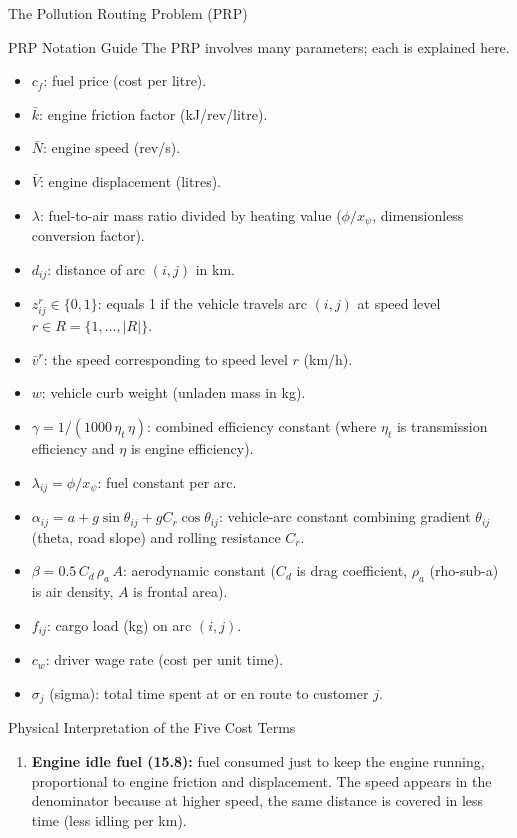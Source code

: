 \documentclass[aspectratio=169,10pt]{beamer}
\begin{document}
\begin{frame}[allowframebreaks]{The Pollution Routing Problem (PRP)}
  \framebreak

  \begin{block}{PRP Notation Guide}
    The PRP involves many parameters; each is explained here.
    \begin{itemize}
      \item $c_f$: fuel price (cost per litre).
      \item $\bar{k}$: engine friction factor (kJ/rev/litre).
      \item $\bar{N}$: engine speed (rev/s).
      \item $\bar{V}$: engine displacement (litres).
      \item $\lambda$: fuel-to-air mass ratio divided by heating value
      ($\phi / x_\psi$, dimensionless conversion factor).
      \item $d_{ij}$: distance of arc $(i,j)$ in km.
      \item $z_{ij}^r \in \{0,1\}$: equals 1 if the vehicle travels arc
      $(i,j)$ at speed level $r \in R = \{1,\ldots,|R|\}$.
      \item $\bar{v}^r$: the speed corresponding to speed level $r$ (km/h).
      \item $w$: vehicle curb weight (unladen mass in kg).
      \item $\gamma = 1/(1000\,\eta_t\,\eta)$: combined efficiency constant
      (where $\eta_t$ is transmission efficiency and $\eta$ is engine efficiency).
      \item $\lambda_{ij}=\phi/x_\psi$: fuel constant per arc.
      \item $\alpha_{ij} = a + g\sin\theta_{ij} + gC_r\cos\theta_{ij}$:
      vehicle-arc constant combining gradient $\theta_{ij}$ (theta, road slope)
      and rolling resistance $C_r$.
      \item $\beta = 0.5\,C_d\,\rho_a\,A$: aerodynamic constant
      ($C_d$ is drag coefficient, $\rho_a$ (rho-sub-a) is air density,
      $A$ is frontal area).
      \item $f_{ij}$: cargo load (kg) on arc $(i,j)$.
      \item $c_w$: driver wage rate (cost per unit time).
      \item $\sigma_j$ (sigma): total time spent at or en route to customer $j$.
    \end{itemize}
  \end{block}

  \framebreak

  \begin{alertblock}{Physical Interpretation of the Five Cost Terms}
    \begin{enumerate}
      \item \textbf{Engine idle fuel (15.8):} fuel consumed just to keep the
      engine running, proportional to engine friction and displacement.
      The speed appears in the denominator because at higher speed, the same
      distance is covered in less time (less idling per km).


\end{enumerate}
\end{alertblock}
\end{frame}
\end{document}
